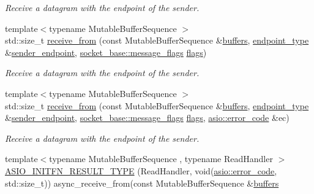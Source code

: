\begin{DoxyCompactItemize}
\begin{DoxyCompactList}\small\item\em Receive a datagram with the endpoint of the sender. \end{DoxyCompactList}\item 
{\footnotesize template$<$typename Mutable\+Buffer\+Sequence $>$ }\\std\+::size\+\_\+t \hyperlink{classasio_1_1basic__datagram__socket_adbc342cdf5d368eabd9d523abe02d259}{receive\+\_\+from} (const Mutable\+Buffer\+Sequence \&\hyperlink{group__async__read_ga54dede45c3175148a77fe6635222c47d}{buffers}, \hyperlink{classasio_1_1basic__datagram__socket_af952c8d18c85588a16531cfc54a172bb}{endpoint\+\_\+type} \&\hyperlink{classasio_1_1basic__datagram__socket_aab9cb430375ca536da3d5a145e6b780e}{sender\+\_\+endpoint}, \hyperlink{classasio_1_1socket__base_ac3cf77465dfedfe1979b5415cf32cc94}{socket\+\_\+base\+::message\+\_\+flags} \hyperlink{classasio_1_1basic__datagram__socket_a787b917059f9c50a483196d3edaf800c}{flags})
\begin{DoxyCompactList}\small\item\em Receive a datagram with the endpoint of the sender. \end{DoxyCompactList}\item 
{\footnotesize template$<$typename Mutable\+Buffer\+Sequence $>$ }\\std\+::size\+\_\+t \hyperlink{classasio_1_1basic__datagram__socket_a7d207e06afd2fa03ade1add1cf6f0c3d}{receive\+\_\+from} (const Mutable\+Buffer\+Sequence \&\hyperlink{group__async__read_ga54dede45c3175148a77fe6635222c47d}{buffers}, \hyperlink{classasio_1_1basic__datagram__socket_af952c8d18c85588a16531cfc54a172bb}{endpoint\+\_\+type} \&\hyperlink{classasio_1_1basic__datagram__socket_aab9cb430375ca536da3d5a145e6b780e}{sender\+\_\+endpoint}, \hyperlink{classasio_1_1socket__base_ac3cf77465dfedfe1979b5415cf32cc94}{socket\+\_\+base\+::message\+\_\+flags} \hyperlink{classasio_1_1basic__datagram__socket_a787b917059f9c50a483196d3edaf800c}{flags}, \hyperlink{classasio_1_1error__code}{asio\+::error\+\_\+code} \&ec)
\begin{DoxyCompactList}\small\item\em Receive a datagram with the endpoint of the sender. \end{DoxyCompactList}\item 
{\footnotesize template$<$typename Mutable\+Buffer\+Sequence , typename Read\+Handler $>$ }\\\hyperlink{classasio_1_1basic__datagram__socket_a0fff1383edb275747411a8045697543a}{A\+S\+I\+O\+\_\+\+I\+N\+I\+T\+F\+N\+\_\+\+R\+E\+S\+U\+L\+T\+\_\+\+T\+Y\+P\+E} (Read\+Handler, void(\hyperlink{classasio_1_1error__code}{asio\+::error\+\_\+code}, std\+::size\+\_\+t)) async\+\_\+receive\+\_\+from(const Mutable\+Buffer\+Sequence \&\hyperlink{group__async__read_ga54dede45c3175148a77fe6635222c47d}{buffers}

\end{DoxyCompactItemize}

